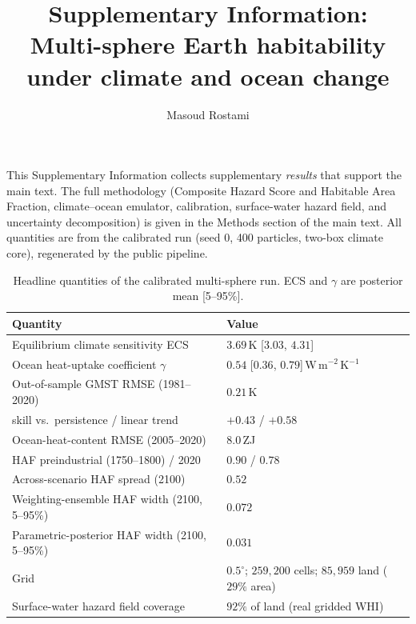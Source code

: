 \documentclass[10pt]{article}
\title{\textbf{\Large
     Supplementary Information:\\
     Multi-sphere Earth habitability under climate and ocean change
 }}
\author{Masoud Rostami}
\date{}
\begin{document}
\maketitle

\noindent This Supplementary Information collects supplementary \emph{results}
that support the main text. The full methodology (Composite Hazard Score and
Habitable Area Fraction, climate--ocean emulator, calibration, surface-water
hazard field, and uncertainty decomposition) is given in the Methods section of
the main text. All quantities are from the calibrated run (seed 0, 400 particles,
two-box climate core), regenerated by the public pipeline.

\bigskip

\begin{table}[h]
\centering
\caption{Headline quantities of the calibrated multi-sphere run. ECS and $\gamma$
are posterior mean [5--95\%].}
\label{tab:headline}
\begin{tabular}{ll}
\toprule
Quantity & Value \\
\midrule
Equilibrium climate sensitivity ECS       & $3.69$\,K [$3.03$, $4.31$] \\
Ocean heat-uptake coefficient $\gamma$     & $0.54$ [$0.36$, $0.79$]\,W\,m$^{-2}$\,K$^{-1}$ \\
Out-of-sample GMST RMSE (1981--2020)       & $0.21$\,K \\
\quad skill vs.\ persistence / linear trend & $+0.43$ / $+0.58$ \\
Ocean-heat-content RMSE (2005--2020)       & $8.0$\,ZJ \\
HAF preindustrial (1750--1800) / 2020      & $0.90$ / $0.78$ \\
Across-scenario HAF spread (2100)          & $0.52$ \\
Weighting-ensemble HAF width (2100, 5--95\%)  & $0.072$ \\
Parametric-posterior HAF width (2100, 5--95\%) & $0.031$ \\
Grid                                       & $0.5^{\circ}$; $259{,}200$ cells; $85{,}959$ land ($29\%$ area) \\
Surface-water hazard field coverage        & $92\%$ of land (real gridded WHI) \\
\bottomrule
\end{tabular}
\end{table}
\end{document}
